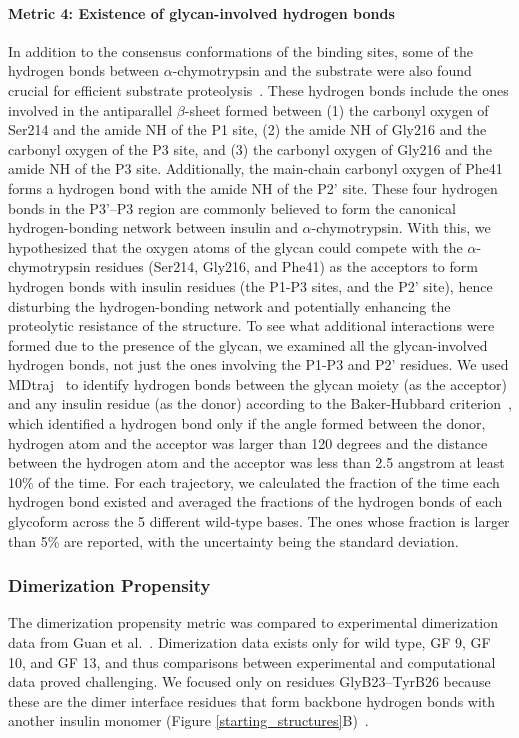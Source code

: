 \documentclass[sn-vancouver]{sn-jnl}
\begin{document}
\paragraph{Metric 4: Existence of glycan-involved hydrogen bonds}
In addition to the consensus conformations of the binding sites, some of the hydrogen bonds between $\alpha$-chymotrypsin and the substrate were also found crucial for efficient substrate proteolysis~\cite{hedstrom2002serine}. These hydrogen bonds include the ones involved in the antiparallel $\beta$-sheet formed between (1) the carbonyl oxygen of Ser214 and the amide NH of the P1 site, (2) the amide NH of Gly216 and the carbonyl oxygen of the P3 site, and (3) the carbonyl oxygen of Gly216 and the amide  NH of the P3 site. Additionally, the main-chain carbonyl oxygen of Phe41 forms a hydrogen bond with the amide NH of the P2' site. These four hydrogen bonds in the P3'--P3 region are commonly believed to form the canonical hydrogen-bonding network between insulin and $\alpha$-chymotrypsin. With this, we hypothesized that the oxygen atoms of the glycan could compete with the $\alpha$-chymotrypsin residues (Ser214, Gly216, and Phe41) as the acceptors to form hydrogen bonds with insulin residues (the P1-P3 sites, and the P2' site), hence disturbing the hydrogen-bonding network and potentially enhancing the proteolytic resistance of the structure. To see what additional interactions were formed due to the presence of the glycan, we examined all the glycan-involved hydrogen bonds, not just the ones involving the P1-P3 and P2' residues. We used MDtraj~\cite{mcgibbon2015mdtraj} to identify hydrogen bonds between the glycan moiety (as the acceptor) and any insulin residue (as the donor) according to the Baker-Hubbard criterion~\cite{baker1984hydrogen}, which identified a hydrogen bond only if the angle formed between the donor, hydrogen atom and the acceptor was larger than 120 degrees and the distance between the hydrogen atom and the acceptor was less than 2.5 angstrom at least 10\% of the time. For each trajectory, we calculated the fraction of the time each hydrogen bond existed and averaged the fractions of the hydrogen bonds of each glycoform across the 5 different wild-type bases. The ones whose fraction is larger than 5\% are reported, with the uncertainty being the standard deviation.

\subsubsection{Dimerization Propensity}
The dimerization propensity metric was compared to experimental dimerization data from Guan et al.~\cite{guan2018chemically}. Dimerization data exists only for wild type, GF 9, GF 10, and GF 13, and thus comparisons between experimental and computational data proved challenging. We focused only on residues GlyB23--TyrB26 because these are the dimer interface residues that form backbone hydrogen bonds with another insulin monomer (Figure \ref{starting_structures}B)~\cite{timofeev2010x, harding1966crystal, antolikova2011dimerinterface}. 
\end{document}
